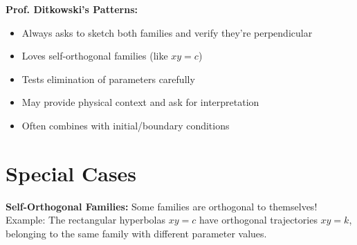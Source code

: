 \documentclass[12pt]{article}
\begin{document}
\begin{examtip}
\textbf{Prof. Ditkowski's Patterns:}
\begin{itemize}
    \item Always asks to sketch both families and verify they're perpendicular
    \item Loves self-orthogonal families (like $xy = c$)
    \item Tests elimination of parameters carefully
    \item May provide physical context and ask for interpretation
    \item Often combines with initial/boundary conditions
\end{itemize}
\end{examtip}

\section{Special Cases}

\begin{insight}
\textbf{Self-Orthogonal Families:}
Some families are orthogonal to themselves! 
Example: The rectangular hyperbolas $xy = c$ have orthogonal trajectories $xy = k$, belonging to the same family with different parameter values.
\end{insight}
\end{document}
